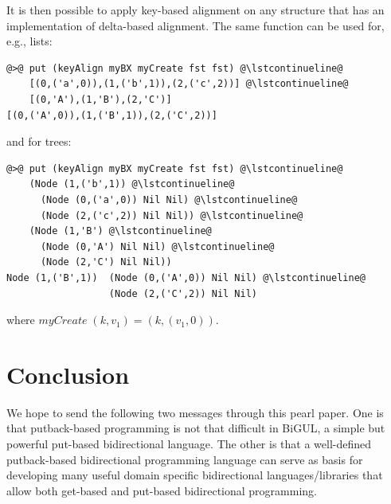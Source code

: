 \documentclass[preprint,numbers]{sigplanconf}
\newcommand{\Conid}[1]{\mathit{#1}}
\newcommand{\Varid}[1]{\mathit{#1}}
\def\resethooks{%
  \global\let\SaveRestoreHook\empty
  \global\let\ColumnHook\empty}
\let\hspre\empty
\let\hspost\empty
\begin{document}
It is then possible to apply key-based alignment on any structure that has an
implementation of delta-based alignment. The same function can be used for,
e.g., lists:
%
\begin{lstlisting}
@>@ put (keyAlign myBX myCreate fst fst) @\lstcontinueline@
    [(0,('a',0)),(1,('b',1)),(2,('c',2))] @\lstcontinueline@
    [(0,'A'),(1,'B'),(2,'C')]
[(0,('A',0)),(1,('B',1)),(2,('C',2))]
\end{lstlisting}
%
and for trees:
%
\begin{lstlisting}
@>@ put (keyAlign myBX myCreate fst fst) @\lstcontinueline@
    (Node (1,('b',1)) @\lstcontinueline@
      (Node (0,('a',0)) Nil Nil) @\lstcontinueline@
      (Node (2,('c',2)) Nil Nil)) @\lstcontinueline@
    (Node (1,'B') @\lstcontinueline@
      (Node (0,'A') Nil Nil) @\lstcontinueline@
      (Node (2,'C') Nil Nil))
Node (1,('B',1))  (Node (0,('A',0)) Nil Nil) @\lstcontinueline@
                  (Node (2,('C',2)) Nil Nil)
\end{lstlisting}
%
where \ensuremath{\Varid{myCreate}\;(\Varid{k},v_1)\mathrel{=}(\Varid{k},(v_1,\mathrm{0}))}.
%

\section{Conclusion}

We hope to send the following two messages through
this pearl paper. One is that putback-based programming is not that 
difficult in BiGUL, a simple but powerful put-based bidirectional
language. The other is that a well-defined putback-based
bidirectional programming language can serve as basis for developing
many useful domain specific bidirectional languages/libraries that
allow both get-based and put-based bidirectional programming.

%

%





%
%
%
\end{document}
